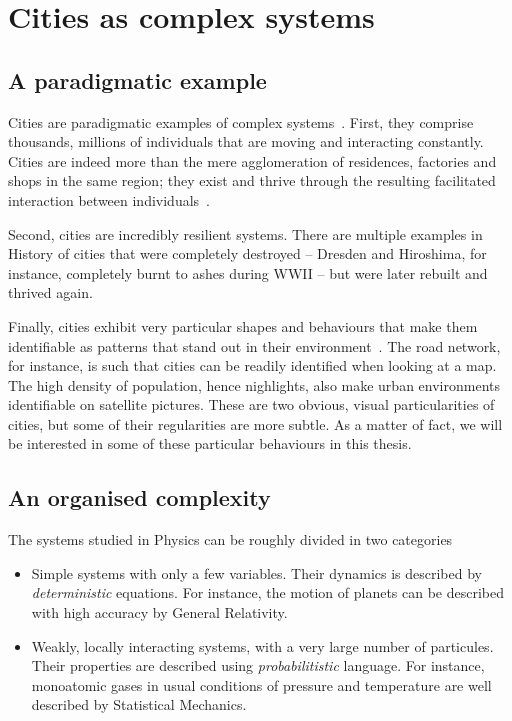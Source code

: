 \section{Cities as complex systems}
\label{sec:cities_as_complex_systems}

\subsection{A paradigmatic example}
\label{sub:a_paradigmatic_example}

Cities are paradigmatic examples of complex systems~\cite{Ladyman:2013}.  First,
they comprise thousands, millions of individuals that are moving and interacting
constantly. Cities are indeed more than the mere agglomeration of residences,
factories and shops in the same region; they exist and thrive through the
resulting facilitated interaction between individuals~\cite{Bettencourt:2013,
Sim:2015}. 

Second, cities are incredibly resilient systems. There are multiple examples in
History of cities that were completely destroyed -- Dresden and Hiroshima, for
instance, completely burnt to ashes during WWII -- but were later rebuilt and
thrived again.

Finally, cities exhibit very particular shapes and behaviours that make them
identifiable as patterns that stand out in their
environment~\cite{Dennett:1991}. The road network, for instance, is such that
cities can be readily identified when looking at a map. The high density of
population, hence nighlights, also make urban environments identifiable on
satellite pictures. These are two obvious, visual particularities of cities, but
some of their regularities are more subtle. As a matter of fact, we will be
interested in some of these particular behaviours in this thesis.\\


\subsection{An organised complexity}
\label{sub:an_organised_complexity}

The systems studied in Physics can be roughly divided in two
categories~\cite{Parisi:1999}

\begin{itemize}
    \item Simple systems with only a few variables. Their dynamics is described
        by \emph{deterministic} equations. For instance, the motion of planets
        can be described with high accuracy by General Relativity.
    \item Weakly, locally interacting systems, with a very large number of
        particules. Their properties are described using \emph{probabilitistic}
        language. For instance, monoatomic gases in usual conditions of pressure
        and temperature are well described by Statistical Mechanics.
\end{itemize}


